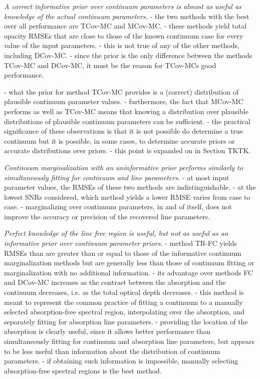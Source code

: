 \documentclass[trackchanges]{aastex62}
\begin{document}
{\emph{A correct informative prior over continuum parameters is almost as useful as knowledge of the actual continuum parameters.}
- the two methods with the best over all performance are TCov-MC and MCov-MC.
- these methods yield total opacity RMSEs that are close to those of the known continuum case for every value of the input parameters.
- this is not true of any of the other methods, including DCov-MC.
- since the prior is the only difference between the methods TCov-MC and DCov-MC, it must be the reason for TCov-MCs good performance.

- what the prior for method TCov-MC provides is a (correct) distribution of plausible continuum parameter values.
- furthermore, the fact that MCov-MC performs as well as TCov-MC means that knowing a distribution over plausible distributions of plausible continuum parameters can be sufficient.
- the practical significance of these observations is that it is not possible do determine a true continuum but it is possible, in some cases, to determine accurate priors or accurate distributions over priors.
- this point is expanded on in Section TKTK.


\emph{Continuum marginalization with an uninformative prior performs similarly to simultaneously fitting for continuum and line parameters.}
- at most input parameter values, the RMSEs of these two methods are indistinguishable.
- at the lowest SNRs considered, which method yields a lower RMSE varies from case to case.
- marginalizing over continuum parameters, in and of itself, does not improve the accuracy or precision of the recovered line parameters.

\emph{Perfect knowledge of the line free region is useful, but not as useful as an informative prior over continuum parameter priors.}
- method TR-FC yields RMSEs than are greater than or equal to those of the informative continuum marginalization methods but are generally less than those of continuum fitting or marginalization with no additional information.
- its advantage over methods FC and DCov-MC increases as the contrast between the absorption and the continuum decreases, i.e. as the total optical depth decreases.
- this method is meant to represent the common practice of fitting a continuum to a manually selected absorption-free spectral region, interpolating over the absorption, and separately fitting for absorption line parameters.
- providing the location of the absorption is clearly useful, since it allows better performance than simultaneously fitting for continuum and absorption line parameters, but appears to be less useful than information about the distribution of continuum parameters.
- if obtaining such information is impossible, manually selecting absorption-free spectral regions is the best method.


}
\end{document}
